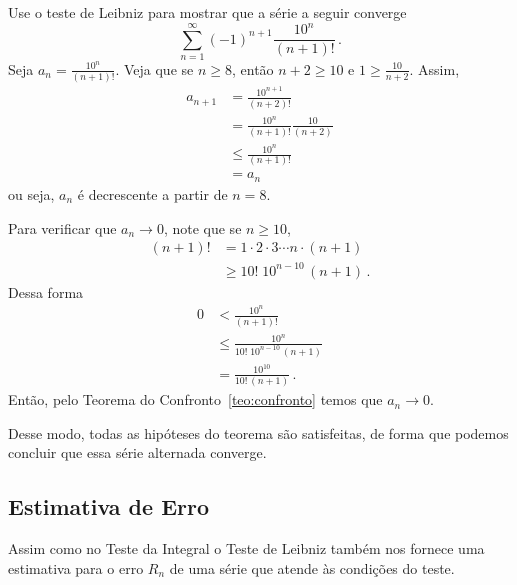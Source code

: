 \begin{example}
  Use o teste de Leibniz para mostrar que a série a seguir converge
  \[
    \sum_{n=1}^\infty(-1)^{n+1}\frac{10^n}{(n+1)!}        \,.
  \]
  \solution
  Seja
  \(
    a_n=\frac{10^n}{(n+1)!}
  \).
  Veja que se $n\geq 8$, então $n+2\geq 10$ e
  \(
    1 \geq \frac{10}{n+2}
  \).
  Assim,
  \begin{align*}
    a_{n+1} & =\frac{10^{n+1}}{(n+2)!}             \\
            & =\frac{10^n}{(n+1)!}\frac{10}{(n+2)} \\
            & \leq \frac{10^n}{(n+1)!}             \\
            & =a_n
  \end{align*}
  ou seja, $a_n$ é decrescente a partir de $n=8$.

  Para verificar que $a_n\to 0$, note que se $n\geq 10$,
  \begin{align*}
    (n+1)! & = 1\cdot 2\cdot 3\cdots n\cdot (n+1) \\
           & \geq 10! \; 10^{n-10}\,(n+1)         \,.
  \end{align*}
  Dessa forma
  \begin{align*}
    0 & <\frac{10^n}{(n+1)!}                    \\
      & \leq \frac{10^n}{10!\;10^{n-10}\,(n+1)} \\
      & =\frac{10^{10}}{10!\,(n+1)}             \,.
  \end{align*}
  Então, pelo Teorema do Confronto~\ref{teo:confronto} temos que $a_n\to 0$.

  Desse modo, todas as hipóteses do teorema são satisfeitas,
  de forma que podemos concluir que essa série alternada converge.
\end{example}

\subsection*{Estimativa de Erro}

Assim como no Teste da Integral o Teste de Leibniz também nos fornece uma
estimativa para o erro $R_n$ de uma série que atende às condições do teste.

